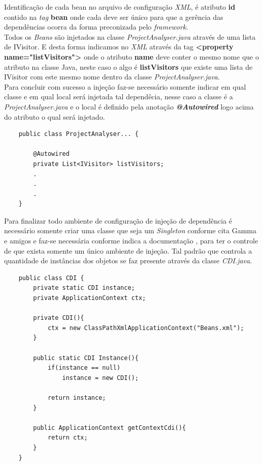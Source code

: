 Identificação de cada bean no arquivo de configuração \textit{XML}, é atributo \textbf{id} contido na {\it tag} \textbf{bean} onde cada deve ser único para que a gerência das dependências ocorra da forma preconizada pelo {\it framework}.\\

Todos os {\it Beans} são injetados na classe \textit{ProjectAnalyser.java} através de uma lista de IVisitor. E desta forma indicamos no \textit{XML} através da tag \textbf{<property name="listVisitors">} onde o atributo \textbf{name} deve conter o mesmo nome que o atributo na classe Java,  neste caso o algo é \textbf{listVisitors} que existe uma lista de IVisitor com este mesmo nome dentro da classe \textit{ProjectAnalyser.java}.\\

Para concluir com sucesso a injeção faz-se necessário somente indicar em qual classe e em qual local será injetada tal dependêcia, nesse caso a classe é a \textit{ProjectAnalyser.java} e o local é definido pela anotação \textbf{\textit{@Autowired}} logo acima do atributo o qual será injetado.\\

\begin{lstlisting}
	public class ProjectAnalyser... {

		@Autowired
		private List<IVisitor> listVisitors;
		.
		.
		.
	}
\end{lstlisting}

Para finalizar todo ambiente de configuração de injeção de dependência é necessário somente criar uma classe que seja um {\it Singleton} \cite{Gamma:1995:DPE:186897} conforme cita Gamma e amigos e faz-se necessária conforme indica a documentação \cite{SPRING_REF}, para ter o controle de que exista somente um único ambiente de injeção. Tal padrão que controla a quantidade de instâncias dos objetos se faz presente através da classe \textit{CDI.java}.
\begin{lstlisting}
	public class CDI {
		private static CDI instance;
		private ApplicationContext ctx;
		
		private CDI(){ 
			ctx = new ClassPathXmlApplicationContext("Beans.xml");
		}
		
		public static CDI Instance(){
			if(instance == null)
				instance = new CDI();
		
			return instance;
		}
		
		public ApplicationContext getContextCdi(){
			return ctx;
		}
	}
\end{lstlisting}

